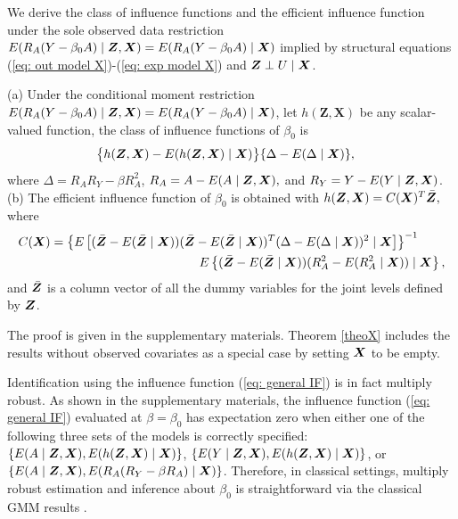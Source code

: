\documentclass[12pt]{article}
\begin{document}
We derive the class of influence functions and the efficient influence function \citep{Bickel:1993}  under the sole observed data restriction $  E(R_A (Y- \beta_0 A )\mid \bm{Z},\bm{X})=E(R_A (Y- \beta_0 A )\mid \bm{X}) $ implied by structural equations (\ref{eq: out model X})-(\ref{eq: exp model X}) and $ \bm{Z}\perp U\mid \bm{X} $. 
\begin{theorem} \label{theoX}
	(a) Under the conditional moment restriction $  E(R_A (Y- \beta_0 A )\mid \bm{Z},\bm{X})=E(R_A (Y- \beta_0 A )\mid \bm{X}) $,	 let $ h(\bm Z, \bm X) $ be any scalar-valued function, the class of influence functions of $ \beta_0 $ is 
	\begin{align}
	& \big\{h(\bm{Z}, \bm{X})- E(h(\bm{Z}, \bm{X})\mid\bm{X})\big\} \{\Delta- E(\Delta\mid \bm{X} )\}, \label{eq: general IF}
	\end{align}
	where $ \Delta = R_A R_Y- \beta R_A^2 $,  $ R_A= A- E(A\mid \bm{Z}, \bm{X}), $ and  $ R_Y= Y- E(Y\mid \bm{Z}, \bm{X}) $. \\
	(b) The efficient influence function of $ \beta_0 $ is  obtained with $ 	h(\bm{Z}, \bm{X}) = C (\bm{X})^T\bar{\bm{Z}},  $ where 
	\begin{align*}
		C (\bm{X})&=\left\{  E\left[ (\bar{\bm{Z}}-E(\bar{\bm{Z}}\mid \bm{X}))(\bar{\bm{Z}}-E(\bar{\bm{Z}}\mid \bm{X}))^T(\Delta- E(\Delta\mid \bm{X}))^2  \mid \bm{X}\right]\right\}^{-1} \\
		&\qquad \qquad \qquad \qquad \qquad \qquad E\left\{ (\bar{\bm{Z}}-E(\bar{\bm{Z}}\mid \bm{X})) (R_A^2- E(R_A^2\mid \bm{X}))\mid \bm{X}\right\},
	\end{align*}
	and 
  $ \bar{\bm{Z}}  $ is a column vector of all the dummy variables for the joint levels defined by $ \bm{Z} $.
\end{theorem}
The proof is given in the supplementary materials. Theorem \ref{theoX} includes the results without observed covariates as a special case by setting $\bm{X}$ to be empty.
 
Identification using the influence function (\ref{eq: general IF}) is in fact multiply robust. As shown in the supplementary materials,  the influence function (\ref{eq: general IF}) evaluated at $ \beta= \beta_0 $ has expectation zero  when  either one of the following three sets of the models is correctly specified: $ \{E(A\mid\bm{Z}, \bm{X}),  E(h(\bm{Z}, \bm{X})\mid\bm{X})\}$, $ \{E(Y\mid\bm{Z}, \bm{X}),  E(h(\bm{Z}, \bm{X})\mid\bm{X})\}$,  or $ \{E(A\mid\bm{Z}, \bm{X}),  E( R_A ( R_Y- \beta R_A) \mid \bm{X})\}$. Therefore, in classical settings, multiply robust estimation and  inference about $ \beta_0 $ is straightforward via the classical GMM results \citep{Hansen:1982aa}. 
\end{document}
